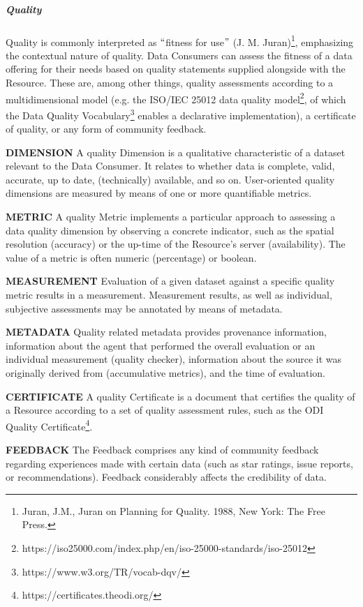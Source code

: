 

\subparagraph*{Quality}
Quality is commonly interpreted as $``$fitness for use$"$  (J. M. Juran)\footnote{Juran, J.M., Juran on Planning for Quality. 1988, New York: The Free Press.  }, emphasizing the contextual nature of quality. Data Consumers can assess the fitness of a data offering for their needs based on quality statements supplied alongside with the Resource. These are, among other things, quality assessments according to a multidimensional model (e.g. the ISO/IEC 25012 data quality model\footnote{https://iso25000.com/index.php/en/iso-25000-standards/iso-25012 }, of which the Data Quality Vocabulary\footnote{https://www.w3.org/TR/vocab-dqv/ } enables a declarative implementation), a certificate of quality, or any form of community feedback.


\textbf{DIMENSION} A quality Dimension is a qualitative characteristic of a dataset relevant to the Data Consumer. It relates to whether data is complete, valid, accurate, up to date, (technically) available, and so on. User-oriented quality dimensions are measured by means of one or more quantifiable metrics. 

\textbf{METRIC} A quality Metric implements a particular approach to assessing a data quality dimension by observing a concrete indicator, such as the spatial resolution (accuracy) or the up-time of the Resource’s server (availability). The value of a metric is often numeric (percentage) or boolean. 

\textbf{MEASUREMENT} Evaluation of a given dataset against a specific quality metric results in a measurement. Measurement results, as well as individual, subjective assessments may be annotated by means of metadata. 

\textbf{METADATA} Quality related metadata provides provenance information, information about the agent that performed the overall evaluation or an individual measurement (quality checker), information about the source it was originally derived from (accumulative metrics), and the time of evaluation.

\textbf{CERTIFICATE} A quality Certificate is a document that certifies the quality of a Resource according to a set of quality assessment rules, such as the ODI Quality Certificate\footnote{https://certificates.theodi.org/ }. 

\textbf{FEEDBACK }The Feedback comprises any kind of community feedback regarding experiences made with certain data (such as star ratings, issue reports, or recommendations). Feedback considerably affects the credibility of data.



